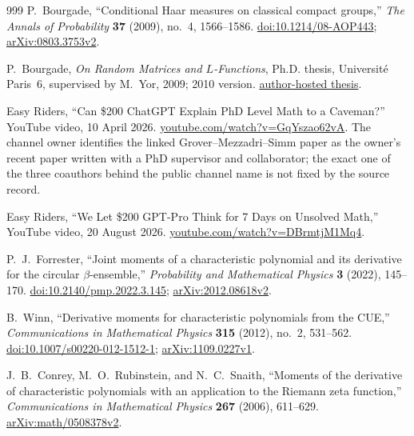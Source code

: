 \begin{thebibliography}{999}
P.~Bourgade,
``Conditional Haar measures on classical compact groups,''
\emph{The Annals of Probability} \textbf{37} (2009), no.~4, 1566--1586.
\href{https://doi.org/10.1214/08-AOP443}{doi:10.1214/08-AOP443};
\href{https://arxiv.org/abs/0803.3753v2}{arXiv:0803.3753v2}.

P.~Bourgade,
\emph{On Random Matrices and $L$-Functions},
Ph.D. thesis, Universit\'e Paris~6, supervised by M.~Yor, 2009; 2010 version.
\href{https://math.nyu.edu/~bourgade/papers/PhDThesis.pdf}{author-hosted thesis}.

Easy Riders,
\textquotedblleft{}Can \$200 ChatGPT Explain PhD Level Math to a Caveman?''
YouTube video, 10 April 2026.
\href{https://www.youtube.com/watch?v=GqYszao62vA}{youtube.com/watch?v=GqYszao62vA}.
The channel owner identifies the linked Grover--Mezzadri--Simm paper as the owner's recent
paper written with a PhD supervisor and collaborator; the exact one of the three coauthors
behind the public channel name is not fixed by the source record.

Easy Riders,
\textquotedblleft{}We Let \$200 GPT-Pro Think for 7 Days on Unsolved Math,''
YouTube video, 20 August 2026.
\href{https://www.youtube.com/watch?v=DBrmtjM1Mq4}{youtube.com/watch?v=DBrmtjM1Mq4}.

P.~J.~Forrester,
\textquotedblleft{}Joint moments of a characteristic polynomial and its derivative for the
circular $\beta$-ensemble,''
\emph{Probability and Mathematical Physics} \textbf{3} (2022), 145--170.
\href{https://doi.org/10.2140/pmp.2022.3.145}{doi:10.2140/pmp.2022.3.145};
\href{https://arxiv.org/abs/2012.08618v2}{arXiv:2012.08618v2}.

B.~Winn,
\textquotedblleft{}Derivative moments for characteristic polynomials from the CUE,''
\emph{Communications in Mathematical Physics} \textbf{315} (2012), no.~2, 531--562.
\href{https://doi.org/10.1007/s00220-012-1512-1}{doi:10.1007/s00220-012-1512-1};
\href{https://arxiv.org/abs/1109.0227v1}{arXiv:1109.0227v1}.

J.~B.~Conrey, M.~O.~Rubinstein, and N.~C.~Snaith,
\textquotedblleft{}Moments of the derivative of characteristic polynomials with an
application to the Riemann zeta function,''
\emph{Communications in Mathematical Physics} \textbf{267} (2006), 611--629.
\href{https://arxiv.org/abs/math/0508378v2}{arXiv:math/0508378v2}.


\end{thebibliography}
